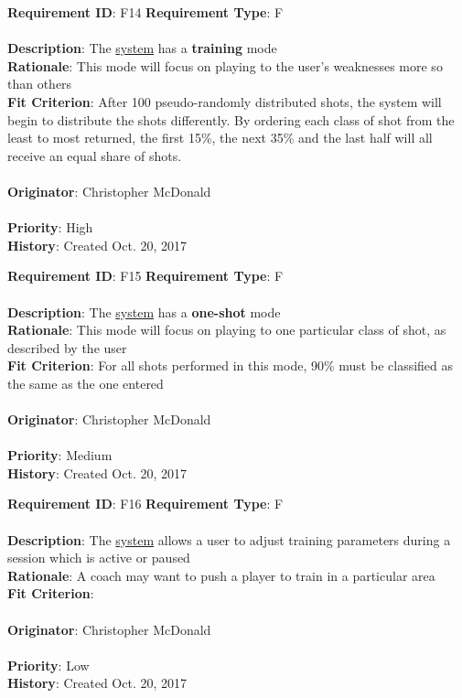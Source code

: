 \documentclass[11pt]{article}
\begin{document}
\begin{framed}
	\noindent\textbf{Requirement ID}: F14 \hfill \textbf{Requirement Type}: F \hfill\\\\
	\noindent\textbf{Description}: The \hyperref[sec:definitions]{system} has a \textbf{training} mode \\
	\textbf{Rationale}: This mode will focus on playing to the user's weaknesses more so than others \\
	\textbf{Fit Criterion}: After 100 pseudo-randomly distributed shots, the system will begin to distribute the shots differently. By ordering each class of shot from the least to most returned, the first 15\%, the next 35\% and the last half will all receive an equal share of shots. \\\\
	\textbf{Originator}: Christopher McDonald \\\\
	\textbf{Priority}: High \hfill \\
	\noindent\textbf{History}: Created Oct. 20, 2017
\end{framed}

\begin{framed}
	\noindent\textbf{Requirement ID}: F15 \hfill \textbf{Requirement Type}: F \hfill\\\\
	\noindent\textbf{Description}: The \hyperref[sec:definitions]{system} has a \textbf{one-shot} mode \\
	\textbf{Rationale}: This mode will focus on playing to one particular class of shot, as described by the user \\
	\textbf{Fit Criterion}: For all shots performed in this mode, 90\% must be classified as the same as the one entered \\\\
	\textbf{Originator}: Christopher McDonald \\\\
	\textbf{Priority}: Medium \hfill \\
	\noindent\textbf{History}: Created Oct. 20, 2017
\end{framed}

\begin{framed}
	\noindent\textbf{Requirement ID}: F16 \hfill \textbf{Requirement Type}: F \hfill\\\\
	\noindent\textbf{Description}: The \hyperref[sec:definitions]{system} allows a user to adjust training parameters during a session which is active or paused \\
	\textbf{Rationale}: A coach may want to push a player to train in a particular area \\
	\textbf{Fit Criterion}:  \\\\
	\textbf{Originator}: Christopher McDonald \\\\
	\textbf{Priority}: Low \hfill \\
	\noindent\textbf{History}: Created Oct. 20, 2017
\end{framed}
\end{document}

